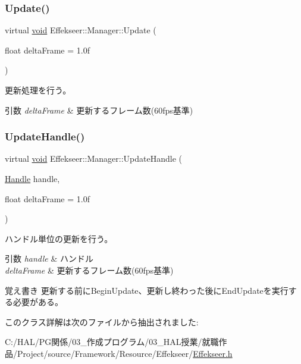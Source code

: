 \subsubsection{\texorpdfstring{Update()}{Update()}}
{\footnotesize\ttfamily virtual \mbox{\hyperlink{namespace_effekseer_ab34c4088e512200cf4c2716f168deb56}{void}} Effekseer\+::\+Manager\+::\+Update (\begin{DoxyParamCaption}\item[{float}]{delta\+Frame = {\ttfamily 1.0f} }\end{DoxyParamCaption})\hspace{0.3cm}{\ttfamily [pure virtual]}}



更新処理を行う。 


\begin{DoxyParams}{引数}
{\em delta\+Frame} & 更新するフレーム数(60fps基準) \\
\hline
\end{DoxyParams}
\mbox{\label{class_effekseer_1_1_manager_afe8a0df796e161f68a511540c76df839}} 
\subsubsection{\texorpdfstring{Update\+Handle()}{UpdateHandle()}}
{\footnotesize\ttfamily virtual \mbox{\hyperlink{namespace_effekseer_ab34c4088e512200cf4c2716f168deb56}{void}} Effekseer\+::\+Manager\+::\+Update\+Handle (\begin{DoxyParamCaption}\item[{\mbox{\hyperlink{namespace_effekseer_afba58b8d812da862190e9bbfc040824a}{Handle}}}]{handle,  }\item[{float}]{delta\+Frame = {\ttfamily 1.0f} }\end{DoxyParamCaption})\hspace{0.3cm}{\ttfamily [pure virtual]}}



ハンドル単位の更新を行う。 


\begin{DoxyParams}{引数}
{\em handle} & ハンドル \\
\hline
{\em delta\+Frame} & 更新するフレーム数(60fps基準) \\
\hline
\end{DoxyParams}
\begin{DoxyNote}{覚え書き}
更新する前に\+Begin\+Update、更新し終わった後に\+End\+Updateを実行する必要がある。 
\end{DoxyNote}


このクラス詳解は次のファイルから抽出されました\+:\begin{DoxyCompactItemize}
\item 
C\+:/\+H\+A\+L/\+P\+G関係/03\+\_\+作成プログラム/03\+\_\+\+H\+A\+L授業/就職作品/\+Project/source/\+Framework/\+Resource/\+Effekseer/\mbox{\hyperlink{_effekseer_8h}{Effekseer.\+h}}\end{DoxyCompactItemize}
